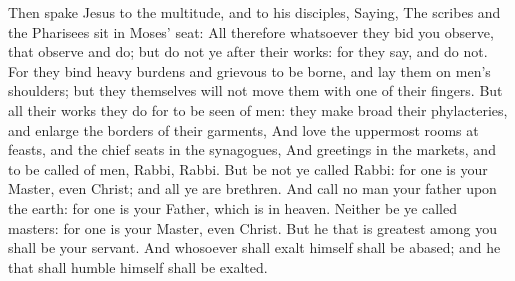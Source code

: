  Then spake Jesus to the multitude, and to his disciples,
 Saying, The scribes and the Pharisees sit in Moses' seat:
 All therefore whatsoever they bid you observe, that observe
and do; but do not ye after their works: for they say, and do not.
 For they bind heavy burdens and grievous to be borne, and
lay them on men's shoulders; but they themselves will not move them with
one of their fingers.  But all their works they do for to be
seen of men: they make broad their phylacteries, and enlarge the borders
of their garments,  And love the uppermost rooms at feasts,
and the chief seats in the synagogues,  And greetings in the
markets, and to be called of men, Rabbi, Rabbi.  But be not
ye called Rabbi: for one is your Master, even Christ; and all ye are
brethren.  And call no man your father upon the earth: for
one is your Father, which is in heaven.  Neither be ye
called masters: for one is your Master, even Christ.  But
he that is greatest among you shall be your servant.  And
whosoever shall exalt himself shall be abased; and he that shall humble
himself shall be exalted.

